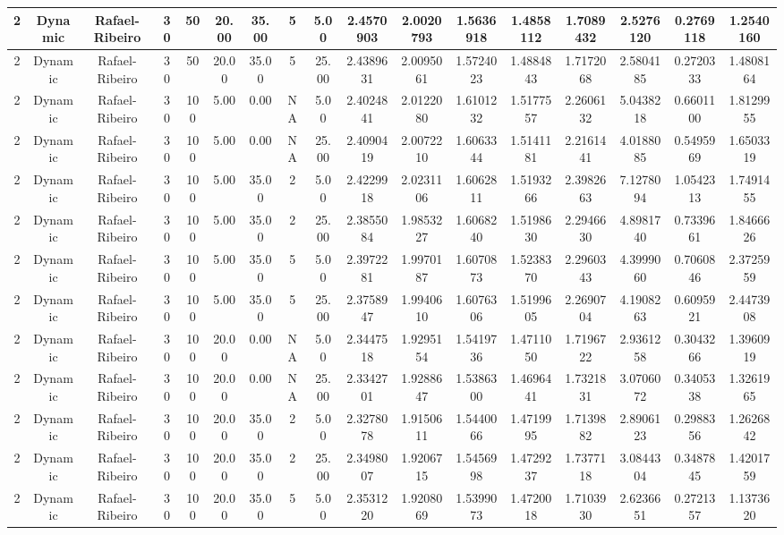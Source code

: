 \begin{longtable}{ | c | c | c | c | c | c | c | c | c | c | c | c | c | c | c | c | c | }
	\hline
	2	&	Dynamic	&	Rafael-Ribeiro	&	30	&	50	&	20.00	&	35.00	&	5	&	5.00	&	2.4570903	&	2.0020793	&	1.5636918	&	1.4858112	&	1.7089432	&	2.5276120	&	0.2769118	&	1.2540160 \\
	\hline
	2	&	Dynamic	&	Rafael-Ribeiro	&	30	&	50	&	20.00	&	35.00	&	5	&	25.00	&	2.4389631	&	2.0095061	&	1.5724023	&	1.4884843	&	1.7172068	&	2.5804185	&	0.2720333	&	1.4808164 \\
	\hline
	2	&	Dynamic	&	Rafael-Ribeiro	&	30	&	100	&	5.00	&	0.00	&	NA	&	5.00	&	2.4024841	&	2.0122080	&	1.6101232	&	1.5177557	&	2.2606132	&	5.0438218	&	0.6601100	&	1.8129955 \\
	\hline
	2	&	Dynamic	&	Rafael-Ribeiro	&	30	&	100	&	5.00	&	0.00	&	NA	&	25.00	&	2.4090419	&	2.0072210	&	1.6063344	&	1.5141181	&	2.2161441	&	4.0188085	&	0.5495969	&	1.6503319 \\
	\hline
	2	&	Dynamic	&	Rafael-Ribeiro	&	30	&	100	&	5.00	&	35.00	&	2	&	5.00	&	2.4229918	&	2.0231106	&	1.6062811	&	1.5193266	&	2.3982663	&	7.1278094	&	1.0542313	&	1.7491455 \\
	\hline
	2	&	Dynamic	&	Rafael-Ribeiro	&	30	&	100	&	5.00	&	35.00	&	2	&	25.00	&	2.3855084	&	1.9853227	&	1.6068240	&	1.5198630	&	2.2946630	&	4.8981740	&	0.7339661	&	1.8466626 \\
	\hline
	2	&	Dynamic	&	Rafael-Ribeiro	&	30	&	100	&	5.00	&	35.00	&	5	&	5.00	&	2.3972281	&	1.9970187	&	1.6070873	&	1.5238370	&	2.2960343	&	4.3999060	&	0.7060846	&	2.3725959 \\
	\hline
	2	&	Dynamic	&	Rafael-Ribeiro	&	30	&	100	&	5.00	&	35.00	&	5	&	25.00	&	2.3758947	&	1.9940610	&	1.6076306	&	1.5199605	&	2.2690704	&	4.1908263	&	0.6095921	&	2.4473908 \\
	\hline
	2	&	Dynamic	&	Rafael-Ribeiro	&	30	&	100	&	20.00	&	0.00	&	NA	&	5.00	&	2.3447518	&	1.9295154	&	1.5419736	&	1.4711050	&	1.7196722	&	2.9361258	&	0.3043266	&	1.3960919 \\
	\hline
	2	&	Dynamic	&	Rafael-Ribeiro	&	30	&	100	&	20.00	&	0.00	&	NA	&	25.00	&	2.3342701	&	1.9288647	&	1.5386300	&	1.4696441	&	1.7321831	&	3.0706072	&	0.3405338	&	1.3261965 \\
	\hline
	2	&	Dynamic	&	Rafael-Ribeiro	&	30	&	100	&	20.00	&	35.00	&	2	&	5.00	&	2.3278078	&	1.9150611	&	1.5440066	&	1.4719995	&	1.7139882	&	2.8906123	&	0.2988356	&	1.2626842 \\
	\hline
	2	&	Dynamic	&	Rafael-Ribeiro	&	30	&	100	&	20.00	&	35.00	&	2	&	25.00	&	2.3498007	&	1.9206715	&	1.5456998	&	1.4729237	&	1.7377118	&	3.0844304	&	0.3487845	&	1.4201759 \\
	\hline
	2	&	Dynamic	&	Rafael-Ribeiro	&	30	&	100	&	20.00	&	35.00	&	5	&	5.00	&	2.3531220	&	1.9208069	&	1.5399073	&	1.4720018	&	1.7103930	&	2.6236651	&	0.2721357	&	1.1373620 \\

\end{longtable}
